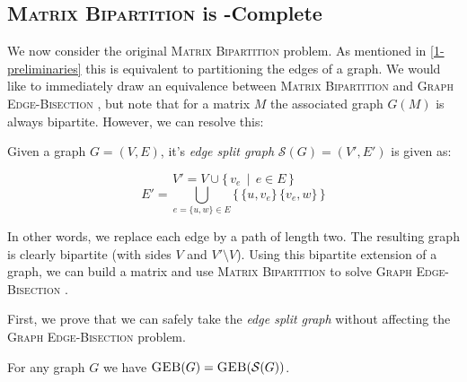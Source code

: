 \documentclass{article}
\newcommand{\mbpt}{\textsc{Matrix \allowbreak Bipartition} }
\newcommand{\geb}{\textsc{Graph \allowbreak Edge-\allowbreak Bisection} }
\newcommand{\sgeb}{\textsc{GEB} }
\begin{document}
	\subsection{\mbpt is \NP-Complete}

	We now consider the original \mbpt problem. As mentioned in
	\autoref{1-preliminaries} this is equivalent to partitioning the edges of
	a graph. We would like to immediately draw an equivalence between \mbpt
	and \geb, but note that for a matrix $M$ the associated graph $G(M)$ is
	always bipartite. However, we can resolve this:

	\begin{definition}
		Given a graph $G = (V, E)$, it's \textit{edge split graph}
		$\mathcal{S}(G) = (V', E')$ is given as:

		$$V' = V \cup \{\, v_e \,\mid\, e \in E \,\}$$
		$$E' = \bigcup_{e = \{u, w\} \in E} \{\,\{u, v_e\}\, \{v_e, w\}\,\}$$
	\end{definition}

	In other words, we replace each edge by a path of length two. The resulting
	graph is clearly bipartite (with sides $V$ and $V' \setminus V$). Using
	this bipartite extension of a graph, we can build a matrix and use \mbpt
	to solve \geb.

	First, we prove that we can safely take the \textit{edge split graph}
	without affecting the \geb problem.

	\begin{proposition}
		\label{split-graph}
		For any graph $G$ we have $\sgeb(G) = \sgeb(\mathcal{S}(G))$.
	\end{proposition}
\end{document}

